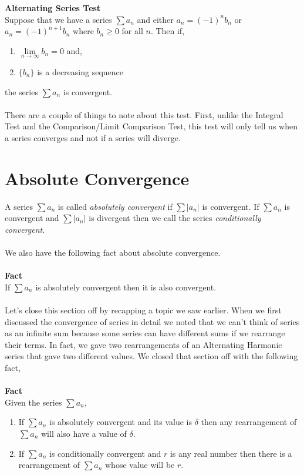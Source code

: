 \documentclass[10pt,reqno]{book}
\theoremstyle{definition}
\begin{document}
	\noindent \textbf{Alternating Series Test}\\
	Suppose that we have a series $ \sum a_n $ and either $ a_n = (-1)^n b_n $ or $ a_n = (-1)^{n+1} b_n $ where $ b_n \geq 0 $ for all $ n $. Then if,
	\begin{enumerate}
		\item $ \lim\limits_{n \to \infty} b_n = 0 $ and,
		\item $ \{ b_n \} $ is a decreasing sequence
	\end{enumerate}
	the series $ \sum a_n $ is convergent.\\ \\
	There are a couple of things to note about this test. First, unlike the Integral Test and the Comparison/Limit Comparison Test, this test will only tell us when a series converges and not if a series will diverge.
	
	
	\section{Absolute Convergence}
	
	A series $ \sum a_n $ is called \textit{absolutely convergent} if $ \sum |a_n| $ is convergent. If $ \sum a_n $ is convergent and $ \sum |a_n| $ is divergent then we call the series \textit{conditionally convergent}.\\ \\
	We also have the following fact about absolute convergence.\\ \\
	\textbf{Fact}\\
	If $ \sum a_n $ is absolutely convergent then it is also convergent.\\ \\
	Let's close this section off by recapping a topic we saw earlier. When we first discussed the convergence of series in detail we noted that we can't think of series as an infinite sum because some series can have different sums if we rearrange their terms. In fact, we gave two rearrangements of an Alternating Harmonic series that gave two different values. We closed that section off with the following fact,\\ \\
	\textbf{Fact}\\
	Given the series $ \sum a_n $,
	\begin{enumerate}
		\item If $ \sum a_n $ is absolutely convergent and its value is $ \delta $ then any rearrangement of $ \sum a_n $ will also have a value of $ \delta $.
		
		\item If $ \sum a_n $ is conditionally convergent and $ r $ is any real number then there is a rearrangement of $ \sum a_n $ whose value will be $ r $. 
	\end{enumerate}
	
\end{document}
